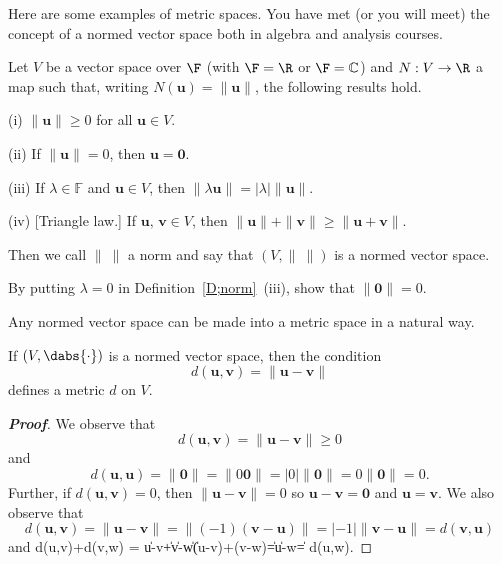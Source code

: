 

Here are some examples of metric spaces. You have met (or you will meet) the concept of a normed vector space both in algebra and analysis courses.
\begin{definition}\label{D;norm}
Let $V$ be a vector space over $\F$ (with $\F=\R$ or $\F={\mathbb C}$) and $N:V\rightarrow\R$ a map such that, writing $N({\mathbf u})=\|{\mathbf u}\|$, the following results hold.

(i) $\|{\mathbf u}\|\geq 0$ for all ${\mathbf u}\in V$.

(ii) If  $\|{\mathbf u}\|=0$, then ${\mathbf u}={\mathbf 0}$.


(iii) If $\lambda\in{\mathbb F}$ and ${\mathbf u}\in V$,
then $\|\lambda{\mathbf u}\|=|\lambda| \|{\mathbf u}\|$.

(iv) [Triangle law.]
If ${\mathbf u},\,{\mathbf v}\in V$, then
$\|{\mathbf u}\|+\|{\mathbf v}\|\geq \|{\mathbf u}+{\mathbf v}\|$.

\noindent Then we call $\|\ \|$ a norm and say that
$(V,\|\ \|)$ is a normed vector space.


\end{definition}






\begin{problem} By putting $\lambda=0$ in Definition~\ref{D;norm}~(iii),
show that $\|{\mathbf  0}\|=0$.
\end{problem}
Any normed vector space can be made into a metric space in a natural way.

\begin{theorem}\label{P;norm to metric}
If $(V,\dabs{\cdot})$ is a normed vector space,
then the condition
\[d({\mathbf u},{\mathbf v})=\|{\mathbf u}-{\mathbf v}\|\]
defines a metric $d$ on $V$.
\end{theorem}
\begin{proof}[\bf Proof] We observe that
\[d({\mathbf u},{\mathbf v})=\|{\mathbf u}-{\mathbf v}\|\geq 0\]
and
\[d({\mathbf u},{\mathbf u})=\|{\mathbf  0}\|=
\|0{\mathbf  0}\|=|0|\|{\mathbf  0}\|
=0\|{\mathbf  0}\|=0.\]
Further, if $d({\mathbf u},{\mathbf v})=0$,
then $\|{\mathbf u}-{\mathbf v}\|=0$
so ${\mathbf u}-{\mathbf v}={\mathbf  0}$ and ${\mathbf u}={\mathbf v}$.
We also observe that
\[d({\mathbf u},{\mathbf v})=\|{\mathbf u}-{\mathbf v}\|=
\|(-1)({\mathbf v}-{\mathbf u})\|
=|-1|\|{\mathbf v}-{\mathbf u}\|=d({\mathbf v},{\mathbf u})\]
and
\be
d({\mathbf u},{\mathbf v})+d({\mathbf v},{\mathbf w}) =  \|{\mathbf u}-{\mathbf v}\|+\|{\mathbf v}-{\mathbf w}\| \geq \|({\mathbf u}-{\mathbf v})+({\mathbf v}-{\mathbf w})\| =\|{\mathbf u}-{\mathbf w}\|= d({\mathbf u},{\mathbf w}).
\ee
\end{proof}

